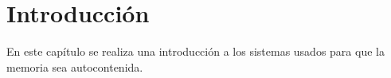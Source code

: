\chapter*{Introducción}

En este capítulo se realiza una introducción a los sistemas usados para
que la memoria sea autocontenida.

